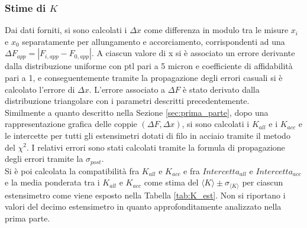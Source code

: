 \documentclass[a4paper,11pt,oneside]{article}
\begin{document}
\subsubsection*{Stime di $K$}
Dai dati forniti, si sono calcolati i $\Delta x$ come differenza in modulo tra le misure $x_i$ e $x_0$ separatamente per allungamento e accorciamento, corrispondenti ad una $\Delta F_{app} =\left | F_{i, app} - F_{0, app} \right |$. A ciascun valore di x si è associato un errore derivante dalla distribuzione uniforme con ptl pari a 5 micron e coefficiente di affidabilità pari a 1, e conseguentemente tramite la propagazione degli errori casuali si è calcolato l'errore di  $\Delta x$. L'errore associato a $\Delta F$ è stato derivato dalla distribuzione triangolare con i parametri descritti precedentemente.\\
Similmente a quanto descritto nella Sezione \ref{sec:prima_parte}, dopo una rappresentazione grafica delle coppie $(\Delta F, \Delta x)$, si sono calcolati i $K_{all}$ e i $K_{acc}$ e le intercette per tutti gli estensimetri dotati di filo in acciaio tramite il metodo del $\chi^2$. I relativi errori sono stati calcolati tramite la formula di propagazione degli errori tramite la $\sigma_{post}$.\\
Si è poi calcolata la compatibilità fra $K_{all}$ e $K_{acc}$ e fra $Intercetta_{all}$ e $Intercetta_{acc}$ e la media ponderata tra i $K_{all}$ e $K_{acc}$ come stima del ${\langle K \rangle }\pm \sigma_{{\langle K\rangle }}$ per ciascun estensimetro come viene esposto nella Tabella \ref{tab:K_est}. Non si riportano i valori del decimo estensimetro in quanto approfonditamente analizzato nella prima parte. 
\end{document}
